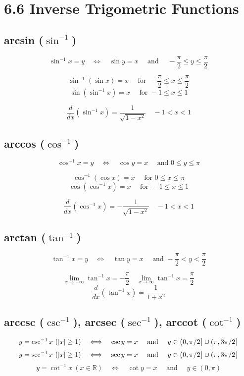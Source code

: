 %
%

\section*{6.6 Inverse Trigometric Functions}


\subsection*{arcsin (\( \sin^{-1} \))}

\[ \sin^{-1}x = y \quad \Leftrightarrow \quad \sin{y} = x \quad \text{ and } \quad -\frac{\pi}{2} \leq y \leq \frac{\pi}{2} \]

\[ \sin^{-1}(\sin{x})=x \quad \text{ for } -\frac{\pi}{2} \leq x \leq \frac{\pi}{2} \]
\[ \sin(\sin^{-1}{x})=x \quad \text{ for } -1 \leq x \leq 1 \]

\[ \frac{d}{dx}(\sin^{-1}x)=\frac{1}{\sqrt{1-x^2}} \quad -1<x<1 \]


\subsection*{arccos (\( \cos^{-1} \))}

\[ \cos^{-1}x = y \quad \Leftrightarrow \quad \cos y = x \quad \text{ and } 0 \leq y \leq \pi  \]

\[ \cos^{-1}(\cos x) = x \quad \text{ for } 0 \leq x \leq \pi \]
\[ \cos(\cos^{-1}x) = x \quad \text{ for } -1 \leq x \leq 1 \]

\[ \frac{d}{dx}(\cos^{-1}x) = -\frac{1}{\sqrt{1-x^2}} \quad -1<x<1 \]


\subsection*{arctan (\( \tan^{-1} \))}

\[ \tan^{-1}x = y \quad \Leftrightarrow \quad \tan y = x \quad \text{ and } -\frac{\pi}{2} < y < \frac{\pi}{2} \]

\[ \lim_{x \to -\infty} \tan^{-1}x = -\frac{\pi}{2} \quad \lim_{x \to \infty} \tan^{-1}x = \frac{\pi}{2} \]
\[ \frac{d}{dx}(\tan^{-1}x) = \frac{1}{1+x^2} \]


\subsection*{arccsc (\( \csc^{-1} \)), arcsec (\( \sec^{-1} \)), arccot (\( \cot^{-1} \))}

\[ y= \csc^{-1}{x}\ (|x| \geq 1) \quad \Longleftrightarrow \quad \csc y = x \quad \text{ and } \quad y \in \big{(} 0, \pi/2 \big{]} \cup (\pi, 3 \pi/2 \big] \]
\[ y= \sec^{-1}{x}\ (|x| \geq 1) \quad \Longleftrightarrow \quad \sec y = x \quad \text{ and } \quad y \in \big{(} 0, \pi/2 \big{]} \cup (\pi, 3 \pi/2 \big] \]
\[ y= \cot^{-1}{x}\ (x \in \mathbb{R}) \quad \Longleftrightarrow \quad \cot y = x \quad \text{ and } \quad y \in (0, \pi) \]


